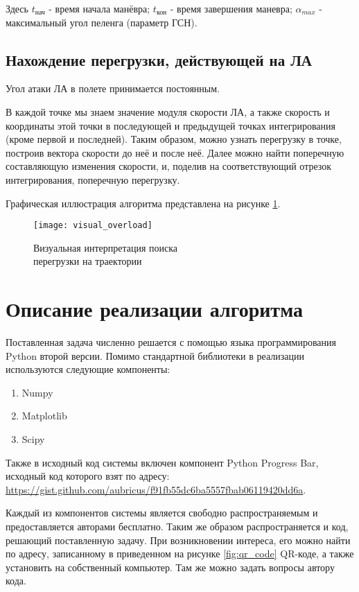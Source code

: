 Здесь $t_\text{нач}$ - время начала манёвра; $t_\text{кон}$ - время завершения маневра; $\alpha_{max}$ - максимальный угол пеленга (параметр ГСН).

\clearpage
\subsection{Нахождение перегрузки, действующей на ЛА}
Угол атаки ЛА в полете принимается постоянным.

В каждой точке мы знаем значение модуля скорости ЛА, а также скорость и координаты этой точки в последующей и предыдущей точках интегрирования (кроме первой и последней). Таким образом, можно узнать перегрузку в точке, построив вектора скорости до неё и после неё. Далее можно найти поперечную составляющую изменения скорости, и, поделив на соответствующий отрезок интегрирования, поперечную перегрузку.

Графическая иллюстрация алгоритма представлена на рисунке \ref{fig:visual_overload}.
\begin{figure}[!h]
\begin{center}
	\texttt{[image: visual\_overload]}
	\caption{Визуальная интерпретация поиска\\ перегрузки на траектории}
	\label{fig:visual_overload}
\end{center}
\end{figure}

\clearpage
\section{Описание реализации алгоритма}
Поставленная задача численно решается с помощью языка программирования Python второй версии. Помимо стандартной библиотеки в реализации используются следующие компоненты:
\begin{enumerate}[1.]
	\item Numpy
	\item Matplotlib
	\item Scipy
\end{enumerate}

Также в исходный код системы включен компонент Python Progress Bar, исходный код которого взят по адресу: \url{https://gist.github.com/aubricus/f91fb55dc6ba5557fbab06119420dd6a}.

Каждый из компонентов системы является свободно распространяемым и предоставляется авторами бесплатно. Таким же образом распространяется и код, решающий поставленную задачу. При возникновении интереса, его можно найти по адресу, записанному в приведенном на рисунке \ref{fig:qr_code} QR-коде, а также установить на собственный компьютер. Там же можно задать вопросы автору кода.

